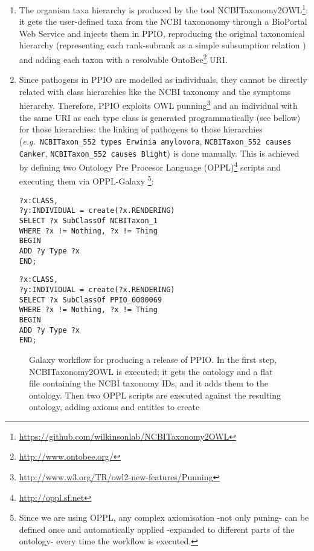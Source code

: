 \documentclass[sw]{iosart2c}
\newcommand{\myurl}[1]{\footnote{\url{#1}}}
\newcommand{\eg}{\emph{e.g.}\xspace}
\newcommand{\con}[1]{\texttt{#1}\xspace}
\begin{document}
\begin{enumerate}

\item The organism taxa hierarchy is produced by the tool NCBITaxonomy2OWL\myurl{https://github.com/wilkinsonlab/NCBITaxonomy2OWL}: it gets the user-defined taxa from the NCBI taxononomy through a BioPortal Web Service \cite{bioportal} and injects them in PPIO, reproducing the original taxonomical hierarchy (representing each rank-subrank as a simple subsumption relation \cite{taxa_ismb_2008}) and adding each taxon with a resolvable OntoBee\myurl{http://www.ontobee.org/} URI.

\item Since pathogens in PPIO are modelled as individuals, they cannot be directly related with class hierarchies like the NCBI taxonomy and the symptoms hierarchy. Therefore, PPIO exploits OWL punning\myurl{http://www.w3.org/TR/owl2-new-features/Punning} and an individual with the same URI as each type class is generated programmatically (see bellow) for those hierarchies: the linking of pathogens to those hierarchies (\eg~\con{NCBITaxon\_552 types Erwinia amylovora}, \con{NCBITaxon\_552 causes Canker}, \con{NCBITaxon\_552 causes Blight}) is done manually. This is achieved by defining two Ontology Pre Procesor Language (OPPL)\myurl{http://oppl.sf.net} scripts and executing them via OPPL-Galaxy \cite{OPPL-Galaxy-JBMS}\footnote{Since we are using OPPL, any complex axiomisation -not only puning- can be defined once and automatically applied -expanded to different parts of the ontology- every time the workflow is executed.}:

{\small 
\begin{verbatim}
?x:CLASS,
?y:INDIVIDUAL = create(?x.RENDERING)
SELECT ?x SubClassOf NCBITaxon_1
WHERE ?x != Nothing, ?x != Thing
BEGIN
ADD ?y Type ?x
END;
\end{verbatim}
}

{\small 
\begin{verbatim}
?x:CLASS,
?y:INDIVIDUAL = create(?x.RENDERING)
SELECT ?x SubClassOf PPIO_0000069
WHERE ?x != Nothing, ?x != Thing
BEGIN
ADD ?y Type ?x
END;
\end{verbatim}
}


\end{enumerate}

\begin{figure*}
\caption{Galaxy workflow for producing a release of PPIO. In the first step, NCBITaxonomy2OWL is executed; it gets the ontology and a flat file containing the NCBI taxonomy IDs, and it adds them to the ontology. Then two OPPL scripts are executed against the resulting ontology, adding axioms and entities to create }\label{fig:galaxy-workflow}
\end{figure*}
\end{document}
